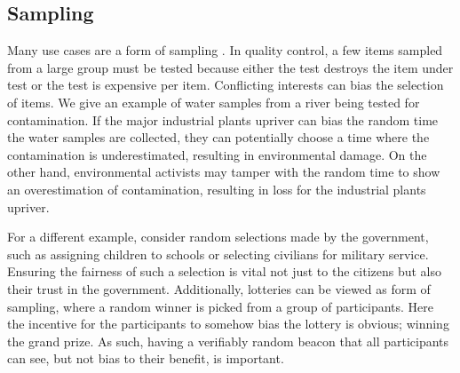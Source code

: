 \subsection{Sampling}

Many use cases are a form of sampling . In quality control, a few items sampled from a large group must be tested because either the test destroys the item under test or the test is expensive per item. Conflicting interests can bias the selection of items. We give an example of water samples from a river being tested for contamination. If the major industrial plants upriver can bias the random time the water samples are collected, they can potentially choose a time where the contamination is underestimated, resulting in environmental damage. On the other hand, environmental activists may tamper with the random time to show an overestimation of contamination, resulting in loss for the industrial plants upriver.

For a different example, consider random selections made by the government, such as assigning children to schools or selecting civilians for military service. Ensuring the fairness of such a selection is vital not just to the citizens but also their trust in the government.
Additionally, lotteries can be viewed as form of sampling, where a random winner is picked from a group of participants. Here the incentive for the participants to somehow bias the lottery is obvious; winning the grand prize. As such, having a verifiably random beacon that all participants can see, but not bias to their benefit, is important.
